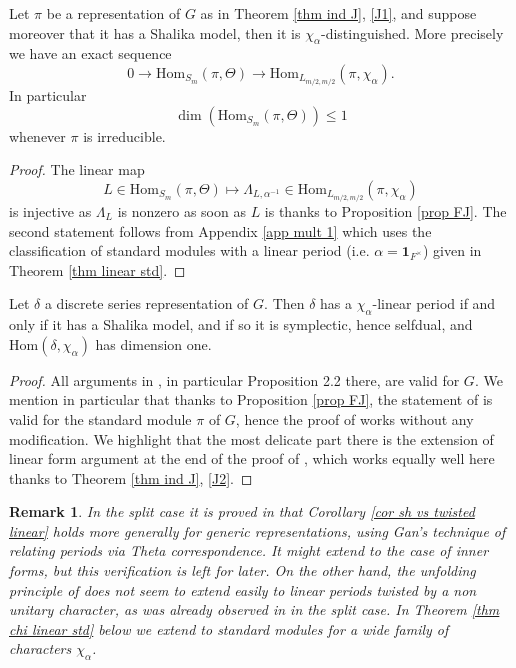 \documentclass[11pt,letterpaper]{amsart}
\newcommand{\Hom}{\mathrm{Hom}}
\newcommand{\triv}{{\mathbf{1}}}
\theoremstyle{plain}
\newtheorem {rem}[thm]{Remark} \newtheorem{ex}[thm]{Example}
\numberwithin{equation}{section}
\begin{document}
\begin{cor}\label{cor shal mult 1}
Let $\pi$ be a representation of $G$ as in Theorem \ref{thm ind J}, \eqref{J1}, and suppose moreover that it has a Shalika model, 
then it is $\chi_{\alpha}$-distinguished. More precisely we have an exact sequence 
\[0\to \Hom_{S_m}(\pi,\Theta)\to \Hom_{L_{m/2,m/2}}(\pi,\chi_{\alpha}).\]
In particular \[\dim(\Hom_{S_m}(\pi,\Theta))\leq 1\] whenever $\pi$ is irreducible. 
\end{cor}
\begin{proof}
The linear map \[L\in \Hom_{S_m}(\pi,\Theta)\mapsto \Lambda_{L,\alpha^{-1}}\in \Hom_{L_{m/2,m/2}}(\pi,\chi_{\alpha})\] is injective as $\Lambda_L$ is nonzero as soon as $L$ is thanks to Proposition \ref{prop FJ}. The second statement follows from 
Appendix \ref{app mult 1} which uses the classification of standard modules with a linear period (i.e. $\alpha=\triv_{F^{\times}}$) given in Theorem \ref{thm linear std}. 
\end{proof}

\begin{cor}\label{cor sh vs twisted linear}
Let $\delta$ a discrete series representation of $G$. Then $\delta$ has a $\chi_\alpha$-linear period if and only if it has a Shalika model, and if so it is symplectic, hence selfdual, and $\Hom(\delta,\chi_\alpha)$ has dimension one.
\end{cor}
\begin{proof}
All arguments in \cite[Section 2]{MatBF2}, in particular Proposition 2.2 there, are valid for $G$. We mention in particular that thanks to Proposition \ref{prop FJ}, the statement of \cite[Proposition 2.3]{MatBF2} is valid for the standard module $\pi$ of $G$, hence the proof of \cite[Theorem 2.1]{MatBF2} works without any modification. We highlight that the most delicate part there is the extension of linear form argument at the end of the proof of 
\cite[Theorem 2.1]{MatBF2}, which works equally well here thanks to Theorem \ref{thm ind J}, \eqref{J2}.
\end{proof}

\begin{rem}
In the split case it is proved in \cite[Corollary 3.6]{Yunitary} that Corollary \ref{cor sh vs twisted linear} holds more generally for generic representations, using Gan's technique of relating periods via Theta correspondence. It might extend to the case of inner forms, but this verification is left for later. On the other hand, the unfolding principle of \cite{SV} does not seem to extend easily to linear periods twisted by a non unitary character, as was already observed in \cite[Remak 2.1]{MatBF2} in the split case. In Theorem \ref{thm chi linear std} below we extend \cite[Corollary 3.6]{Yunitary} to standard modules for a wide family of characters $\chi_{\alpha}$.
\end{rem}
\end{document}
